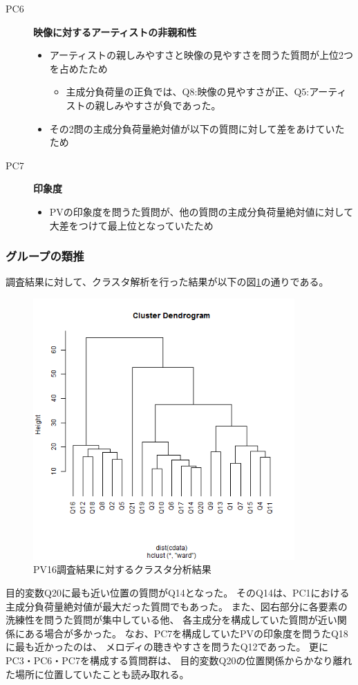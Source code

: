 \documentclass[11pt,a4paper, uplatex]{jsarticle}
\begin{document}
\begin{description}
  \item[PC6] {\bf 映像に対するアーティストの非親和性}
  \begin{itemize}
    \item アーティストの親しみやすさと映像の見やすさを問うた質問が上位2つを占めたため
    \begin{itemize}
      \item 主成分負荷量の正負では、Q8:映像の見やすさが正、Q5:アーティストの親しみやすさが負であった。
    \end{itemize}
    \item その2問の主成分負荷量絶対値が以下の質問に対して差をあけていたため
  \end{itemize}

  \item[PC7] {\bf 印象度}
  \begin{itemize}
    \item PVの印象度を問うた質問が、他の質問の主成分負荷量絶対値に対して大差をつけて最上位となっていたため
  \end{itemize}
\end{description}

\subsubsection{グループの類推}
調査結果に対して、クラスタ解析を行った結果が以下の図\ref{fig:clusterPV}の通りである。
\begin{figure}[h]
  \begin{center}
    \includegraphics[width=10cm]{clusterPV.bmp}
    \caption{PV16調査結果に対するクラスタ分析結果}
    \label{fig:clusterPV}
  \end{center}
\end{figure}
目的変数Q20に最も近い位置の質問がQ14となった。
そのQ14は、PC1における主成分負荷量絶対値が最大だった質問でもあった。
また、図右部分に各要素の洗練性を問うた質問が集中している他、
各主成分を構成していた質問が近い関係にある場合が多かった。
なお、PC7を構成していたPVの印象度を問うたQ18に最も近かったのは、
メロディの聴きやすさを問うたQ12であった。
更にPC3・PC6・PC7を構成する質問群は、
目的変数Q20の位置関係からかなり離れた場所に位置していたことも読み取れる。
\end{document}

